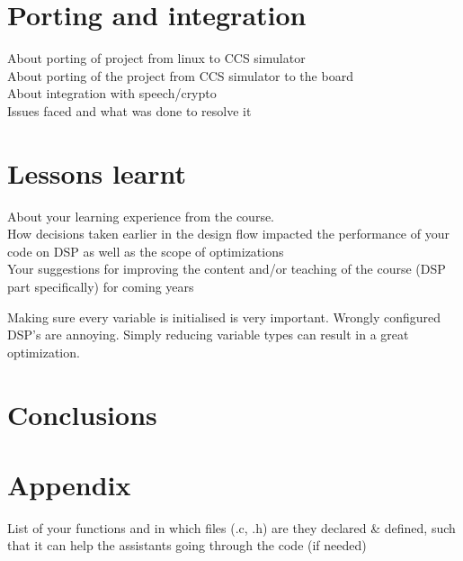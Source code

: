 \documentclass[a4paper]{article}
\begin{document}
\section{Porting and integration}
About porting of project from linux to CCS simulator \\
About porting of the project from CCS simulator to the board \\
About integration with speech/crypto \\
Issues faced and what was done to resolve it

\section{Lessons learnt}
About your learning experience from the course.\\
How decisions taken earlier in the design flow impacted the performance of your code on DSP as
well as the scope of optimizations\\
 Your suggestions for improving the content and/or teaching of the course (DSP part specifically) for
coming years

Making sure every variable is initialised is very important.
Wrongly configured DSP's are annoying.
Simply reducing variable types can result in a great optimization.

\section{Conclusions}

\section{Appendix}
List of your functions and in which files (.c, .h) are they declared \& defined, such that it can help the assistants going through the code (if needed)
\end{document}
